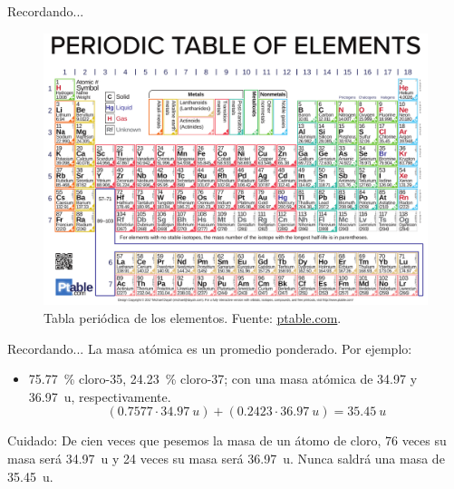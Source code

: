 \documentclass{beamer}
\begin{document}
  \begin{frame}{Recordando...}
    \begin{figure}
      \centering
      \includegraphics[width=0.9\linewidth]{imgs/periodic-table.pdf}
      \caption{Tabla periódica de los elementos. Fuente: \href{https://ptable.com}{ptable.com}.}
      \label{fig:pt-atomic-mass}
    \end{figure}
  \end{frame}
  \begin{frame}{Recordando...}
    La masa atómica es un promedio ponderado. Por ejemplo:
    \begin{itemize}
      \item \qty{75.77}{\percent} cloro-35, \qty{24.23}{\percent} cloro-37; con una masa atómica de \num{34.97} y \qty{36.97}{u}, respectivamente.
      \[(0.7577\cdot\qty{34.97}{u}) + (0.2423\cdot\qty{36.97}{u}) = \qty{35.45}{u}\]
    \end{itemize}
    \begin{block}{Cuidado:}
      De cien veces que pesemos la masa de un átomo de cloro, 76 veces su masa será \qty{34.97}{u} y 24 veces su masa será \qty{36.97}{u}. Nunca saldrá una masa de \qty{35.45}{u}.
    \end{block}
  \end{frame}
\end{document}
